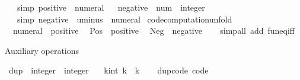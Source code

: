 \begin{isabellebody}
\ \ \ {\isacharbrackleft}{\kern0pt}simp{\isacharbrackright}{\kern0pt}{\isacharcolon}{\kern0pt}\ {\isachardoublequoteopen}positive\ {\isacharequal}{\kern0pt}\ numeral{\isachardoublequoteclose}\isanewline
\isanewline
{}\ \isamarkupfalse%
\ negative\ {\isacharcolon}{\kern0pt}{\isacharcolon}{\kern0pt}\ {\isachardoublequoteopen}num\ {\isasymRightarrow}\ integer{\isachardoublequoteclose}\isanewline
\ \ \ {\isacharbrackleft}{\kern0pt}simp{\isacharbrackright}{\kern0pt}{\isacharcolon}{\kern0pt}\ {\isachardoublequoteopen}negative\ {\isacharequal}{\kern0pt}\ uminus\ {\isasymcirc}\ numeral{\isachardoublequoteclose}\isanewline
\isanewline
{}\isamarkupfalse%
\ {\isacharbrackleft}{\kern0pt}code{\isacharunderscore}{\kern0pt}computation{\isacharunderscore}{\kern0pt}unfold{\isacharbrackright}{\kern0pt}{\isacharcolon}{\kern0pt}\isanewline
\ \ {\isachardoublequoteopen}numeral\ {\isacharequal}{\kern0pt}\ positive{\isachardoublequoteclose}\isanewline
\ \ {\isachardoublequoteopen}Pos\ {\isacharequal}{\kern0pt}\ positive{\isachardoublequoteclose}\isanewline
\ \ {\isachardoublequoteopen}Neg\ {\isacharequal}{\kern0pt}\ negative{\isachardoublequoteclose}\isanewline
%
\isadelimproof
\ \ %
\endisadelimproof
%
\isatagproof
{}\isamarkupfalse%
\ {\isacharparenleft}{\kern0pt}simp{\isacharunderscore}{\kern0pt}all\ add{\isacharcolon}{\kern0pt}\ fun{\isacharunderscore}{\kern0pt}eq{\isacharunderscore}{\kern0pt}iff{\isacharparenright}{\kern0pt}%
\endisatagproof
{\isafoldproof}%
%
\isadelimproof
\isanewline
%
\endisadelimproof
\isanewline
{}\isamarkupfalse%
%
\begin{isamarkuptext}%
Auxiliary operations%
\end{isamarkuptext}\isamarkuptrue%
\isamarkupfalse%
\ dup\ {\isacharcolon}{\kern0pt}{\isacharcolon}{\kern0pt}\ {\isachardoublequoteopen}integer\ {\isasymRightarrow}\ integer{\isachardoublequoteclose}\isanewline
\ \ \ {\isachardoublequoteopen}{\isasymlambda}k{\isacharcolon}{\kern0pt}{\isacharcolon}{\kern0pt}int{\isachardot}{\kern0pt}\ k\ {\isacharplus}{\kern0pt}\ k{\isachardoublequoteclose}\isanewline
%
\isadelimproof
\ \ %
\endisadelimproof
%
\isatagproof
\isacommand{{\isachardot}{\kern0pt}}\isamarkupfalse%
%
\endisatagproof
{\isafoldproof}%
%
\isadelimproof
\isanewline
%
\endisadelimproof
\isanewline
{}\isamarkupfalse%
\ dup{\isacharunderscore}{\kern0pt}code\ {\isacharbrackleft}{\kern0pt}code{\isacharbrackright}{\kern0pt}{\isacharcolon}{\kern0pt}\isanewline

\end{isabellebody}
